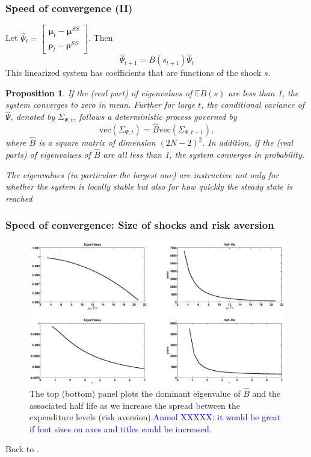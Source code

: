 \documentclass{beamer}
\newcommand{\bmat}{\begin{matrix}}
\newcommand{\emat}{\end{matrix}}
\newtheorem{proposition}{Proposition}
\begin{document}
\begin{frame}
\frametitle{Speed of convergence  (II) }
Let $\hat{\Psi}_{t}= \left[\bmat \bm{\mu}_{t} - \bm{\mu}^{SS}\\ \bm \rho_t - \bm \rho^{SS}\emat\right]$. Then 
\begin{equation*}
 \hat{\Psi}_{t+1}=B(s_{t+1})\hat{\Psi}_t
\end{equation*}
This linearized system has coefficients that are functions of the shock $s$.
\small

\begin{proposition}\label{prop: localstability}
If the (real part) of eigenvalues of $\mathbb{E}B(s)$ are less than 1,  the system  converges to zero  in mean. Further for large $t$, the conditional variance of $\hat{\Psi}$, denoted by $\Sigma_{\Psi,t}$, follows a deterministic process governed by
\[\text{vec}(\Sigma_{\Psi,t})=\hat{B} \text{vec}(\Sigma_{\Psi,t-1}),\]	
where $\hat{B}$ is a square matrix of dimension $(2N-2)^2$. In addition,  if the (real parts) of eigenvalues of $\hat{B}$ are all less than 1, the system converges in probability.
\end{proposition}

\color{red}\emph{The eigenvalues (in particular the largest one) are instructive not only for whether the system is locally stable but also for how quickly the steady state is reached}

\end{frame}

\begin{frame}
\frametitle{Speed of convergence: Size of shocks and risk aversion}
  \begin{figure}[htp]
 \centering
 \includegraphics[width=\textwidth]{Draft25Graphs/eigenvalues.eps}
 \caption{The top (bottom) panel plots the dominant eigenvalue of $\hat{B}$ and the associated half life as we increase
the spread between the expenditure levels (risk aversion).\textcolor{blue}{Anmol XXXXX: it would be great if font sizes on axes and titles could be increased.}}
 \label{fig: Eigenvalues}
 \end{figure}
 Back to \hyperlink{main}{}.
 \end{frame}
 
\end{document}

